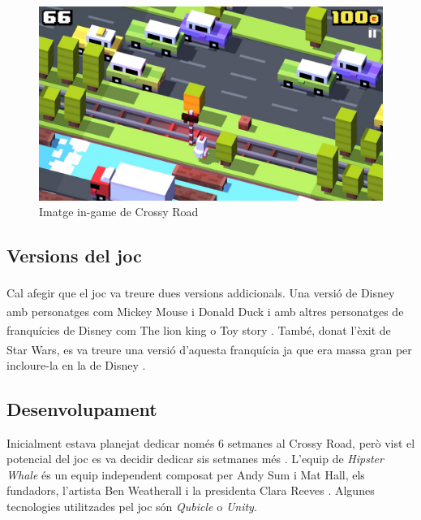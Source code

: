 \documentclass{article}
\begin{document}
\begin{figure}
	\includegraphics[width=\linewidth]{CrossyRoadGameplay.jpg}
	\caption{Imatge in-game de Crossy Road}
	\label{inGame}
\end{figure}

\subsection{Versions del joc}

Cal afegir que el joc va treure dues versions addicionals. Una versió de
Disney\textsuperscript{\textregistered} amb personatges com Mickey Mouse\textsuperscript{\texttrademark} i
Donald Duck\textsuperscript{\texttrademark} i amb altres personatges
de franquícies de Disney com The lion king\textsuperscript{\texttrademark}
o Toy story\textsuperscript{\texttrademark} \cite{disneyCrossy}. També,
donat l'èxit de Star Wars\textsuperscript{\texttrademark}, es va treure
una versió d'aquesta franquícia ja que era massa gran per incloure-la en
la de Disney \cite{starWarsCrossy}. \newline

\subsection{Desenvolupament}

Inicialment estava planejat dedicar només 6 setmanes al Crossy Road, però vist el
potencial del joc es va decidir dedicar sis setmanes més \cite{delayedCrossy}. L'equip
de \textit{Hipster Whale} és un equip independent composat per Andy Sum i Mat Hall, els
fundadors, l'artista Ben Weatherall i la presidenta Clara Reeves \cite{HipsterPressKit}.
Algunes tecnologies utilitzades pel joc són \textit{Qubicle} \cite{qubicle} \cite{crossyPressKit} o \textit{Unity}.
\end{document}
